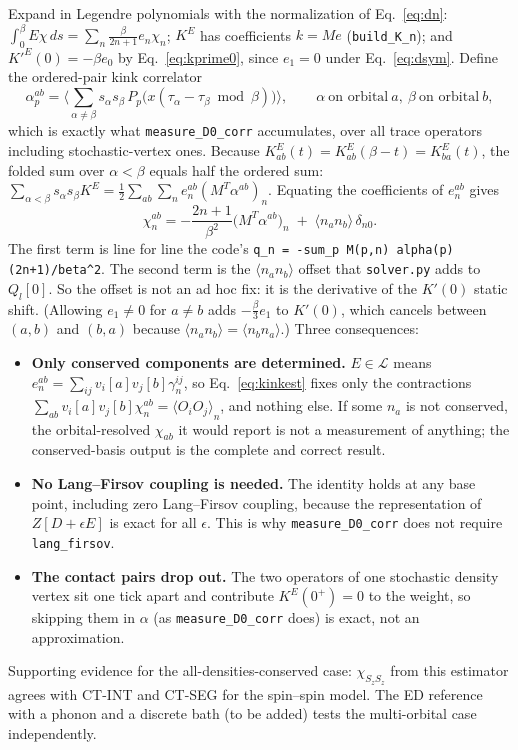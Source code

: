 \documentclass[a4paper,12pt]{article}
\newcommand{\aver}[1]{\ensuremath{\langle#1\rangle}}
\renewcommand{\t}{\ensuremath{\tau}}
\begin{document}
Expand in Legendre polynomials with the normalization of Eq.~\eqref{eq:dn}:
$\int_0^\beta E\chi\,ds=\sum_n\frac{\beta}{2n+1}e_n\chi_n$; $K^E$ has coefficients
$k=Me$ (\texttt{build\_K\_n}); and $K'^E(0)=-\beta e_0$ by Eq.~\eqref{eq:kprime0}, since
$e_1=0$ under Eq.~\eqref{eq:dsym}. Define the ordered-pair kink correlator
\[
  \alpha^{ab}_p=\aver{\sum_{\alpha\neq\beta}s_\alpha s_\beta\,
  P_p\big(x(\t_\alpha-\t_\beta\bmod\beta)\big)},\qquad
  \alpha\ \text{on orbital}\ a,\ \beta\ \text{on orbital}\ b,
\]
which is exactly what \texttt{measure\_D0\_corr} accumulates, over all trace operators
including stochastic-vertex ones. Because $K^E_{ab}(t)=K^E_{ab}(\beta-t)=K^E_{ba}(t)$,
the folded sum over $\alpha<\beta$ equals half the ordered sum:
$\sum_{\alpha<\beta}s_\alpha s_\beta K^E=\tfrac12\sum_{ab}\sum_n e^{ab}_n(M^T\alpha^{ab})_n$.
Equating the coefficients of $e^{ab}_n$ gives
\begin{equation}
  \chi^{ab}_n=-\frac{2n+1}{\beta^2}\big(M^T\alpha^{ab}\big)_n
  \;+\;\aver{n_an_b}\,\delta_{n0}.
  \label{eq:kinkest}
\end{equation}
The first term is line for line the code's \verb|q_n = -sum_p M(p,n) alpha(p) (2n+1)/beta^2|.
The second term is the $\aver{n_an_b}$ offset that \texttt{solver.py} adds to
$Q_l[0]$. So the offset is not an ad hoc fix: it is the derivative of the $K'(0)$ static
shift. (Allowing $e_1\neq0$ for $a\neq b$ adds $-\tfrac\beta3e_1$ to $K'(0)$, which
cancels between $(a,b)$ and $(b,a)$ because $\aver{n_an_b}=\aver{n_bn_a}$.) Three
consequences:
\begin{itemize}
  \item \textbf{Only conserved components are determined.} $E\in\mathcal L$ means
    $e^{ab}_n=\sum_{ij}v_i[a]v_j[b]\gamma^{ij}_n$, so Eq.~\eqref{eq:kinkest} fixes only
    the contractions $\sum_{ab}v_i[a]v_j[b]\chi^{ab}_n=\aver{O_iO_j}_n$, and nothing
    else. If some $n_a$ is not conserved, the orbital-resolved $\chi_{ab}$ it would
    report is not a measurement of anything; the conserved-basis output is the complete
    and correct result.
  \item \textbf{No Lang--Firsov coupling is needed.} The identity holds at any base
    point, including zero Lang--Firsov coupling, because the representation of
    $Z[D+\epsilon E]$ is exact for all $\epsilon$. This is why \texttt{measure\_D0\_corr}
    does not require \texttt{lang\_firsov}.
  \item \textbf{The contact pairs drop out.} The two operators of one stochastic density
    vertex sit one tick apart and contribute $K^E(0^+)=0$ to the weight, so skipping
    them in $\alpha$ (as \texttt{measure\_D0\_corr} does) is exact, not an
    approximation.
\end{itemize}
Supporting evidence for the all-densities-conserved case: $\chi_{S_zS_z}$ from this
estimator agrees with CT-INT and CT-SEG for the spin--spin model. The ED reference with
a phonon and a discrete bath (to be added) tests the multi-orbital case independently.
\end{document}

